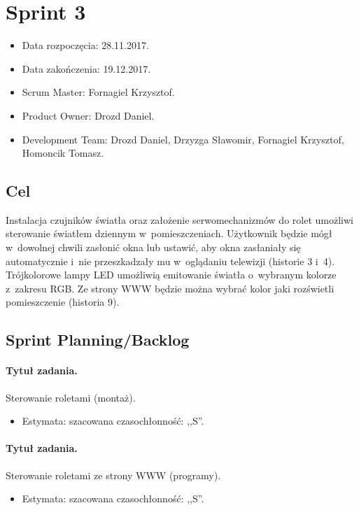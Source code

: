 \section{Sprint 3}
\begin{itemize}
	\item Data rozpoczęcia: 28.11.2017.
	\item Data zakończenia: 19.12.2017.
	\item Scrum Master: Fornagiel Krzysztof.
	\item Product Owner: Drozd Daniel.
	\item Development Team: Drozd Daniel, Drzyzga Sławomir, Fornagiel Krzysztof, Homoncik Tomasz.
\end{itemize}
\subsection{Cel} 


Instalacja czujników światła oraz założenie serwomechanizmów do rolet umożliwi sterowanie światłem dziennym w~pomieszczeniach. Użytkownik będzie mógł w~dowolnej chwili zasłonić okna lub ustawić, aby okna zasłaniały się automatycznie i~nie przeszkadzały mu w~oglądaniu telewizji (historie 3 i~4). Trójkolorowe lampy LED umożliwią emitowanie światła o~wybranym kolorze z~zakresu RGB. Ze strony WWW będzie można wybrać kolor jaki rozświetli pomieszczenie (historia 9).



\subsection{Sprint Planning/Backlog}

\paragraph{Tytuł zadania.} Sterowanie roletami (montaż).
\begin{itemize}
	\item Estymata: szacowana czasochłonność: ,,S''.
\end{itemize}

\paragraph{Tytuł zadania.} Sterowanie roletami ze strony WWW (programy).
\begin{itemize}
	\item Estymata: szacowana czasochłonność: ,,S''.
\end{itemize}

